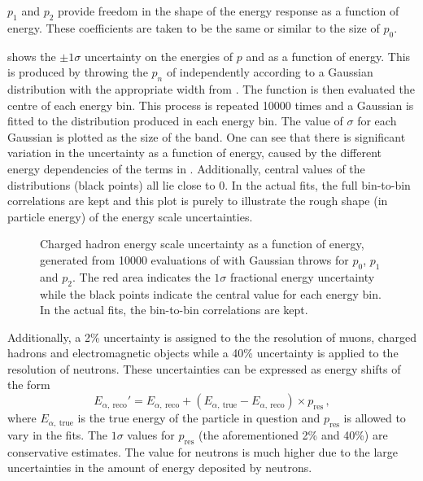 $p_{1}$ and $p_{2}$ provide freedom in the shape of the energy response as a function of energy.
These coefficients are taken to be the same or similar to the size of $p_{0}$.

 shows the $\pm1\sigma$ uncertainty on the energies of $p$ and \pipm as a function of energy.
This is produced by throwing the $p_{n}$ of  independently according to a Gaussian distribution with the appropriate width from . The function is then evaluated the centre of each energy bin.
This process is repeated \num{10000} times and a Gaussian is fitted to the distribution produced in each energy bin.
The value of $\sigma$ for each Gaussian is plotted as the size of the band.
One can see that there is significant variation in the uncertainty as a function of energy, caused by the different energy dependencies of the terms in .
Additionally, central values of the distributions (black points) all lie close to 0.
In the actual fits, the full bin-to-bin correlations are kept and this plot is purely to illustrate the rough shape (in particle energy) of the energy scale uncertainties.

\begin{figure}[h]
  \begin{adjustbox}{max totalsize=.6\textwidth, center}
    
  \end{adjustbox}
  \caption[Charged hadron energy scale uncertainty as a function of energy.]{Charged hadron energy scale uncertainty as a function of energy, generated from \num{10000} evaluations of  with Gaussian throws for $p_{0}$, $p_{1}$ and $p_{2}$. The red area indicates the $1\sigma$ fractional energy uncertainty while the black points indicate the central value for each energy bin. In the actual fits, the bin-to-bin correlations are kept.}
  \label{fig:protonEScale}
\end{figure}

Additionally, a 2\% uncertainty is assigned to the the resolution of muons, charged hadrons and electromagnetic objects while a 40\% uncertainty is applied to the resolution of neutrons.
These uncertainties can be expressed as energy shifts of the form
\begin{equation}
	E_{\alpha,~\text{reco}}' = E_{\alpha,~\text{reco}} + \left( E_{\alpha,~\text{true}} - E_{\alpha,~\text{reco}} \right) \times p_{\text{res}} \, ,
\end{equation}
where $E_{\alpha,~\text{true}}$ is the true energy of the particle in question and $p_{\text{res}}$ is allowed to vary in the fits.
The $1\sigma$ values for $p_{\text{res}}$ (the aforementioned 2\% and 40\%) are conservative estimates. 
The value for neutrons is much higher due to the large uncertainties in the amount of energy deposited by neutrons.

